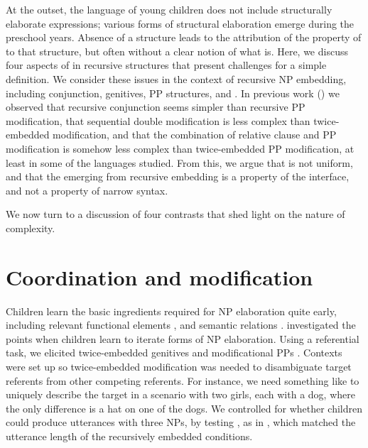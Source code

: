 \documentclass[output=paper]{langsci/langscibook}
\begin{document}
At the outset, the language of young children does not include structurally
elaborate expressions; various forms of structural elaboration emerge during
the preschool years. Absence of a structure leads to the attribution of the
property of  to that structure, but often without a clear notion of
what  is. Here, we discuss four aspects of  in recursive
structures that present challenges for a simple definition. We consider these
issues in the context of recursive NP embedding, including conjunction,
genitives, PP structures, and . In previous work
(\citealt{Perez-LerouxEtAl2012,Perez-LerouxEtAl2018a,Perez-LerouxEtAl2018b}) we
observed that recursive conjunction seems simpler than recursive PP
modification, that sequential double modification is less complex than
twice-embedded modification, and that the combination of relative clause and PP
modification is somehow less complex than twice-embedded PP modification, at
least in some of the languages studied. From this, we argue that  is
not uniform, and that the  emerging from recursive embedding is a
property of the interface, and not a property of narrow syntax.

We now turn to a discussion of four contrasts that shed light on the nature of
complexity.

\section{Coordination and modification}

Children learn the basic ingredients required for NP elaboration quite early,
including relevant functional elements \citep{Brown1973}, and semantic
relations \citep{BloomEtAl1975}. \citet{Perez-LerouxEtAl2012} investigated the
points when children learn to iterate forms of NP elaboration. Using a
referential task, we elicited twice-embedded genitives  and
modificational PPs . Contexts were set up so twice-embedded
modification was needed to disambiguate target referents from other competing
referents. For instance, we need something like  to uniquely
describe the target in a scenario with two girls, each with a dog, where the
only difference is a hat on one of the dogs.  We controlled for whether
children could produce utterances with three NPs, by testing
, as in , which matched the utterance length of
the recursively embedded conditions.
\end{document}
